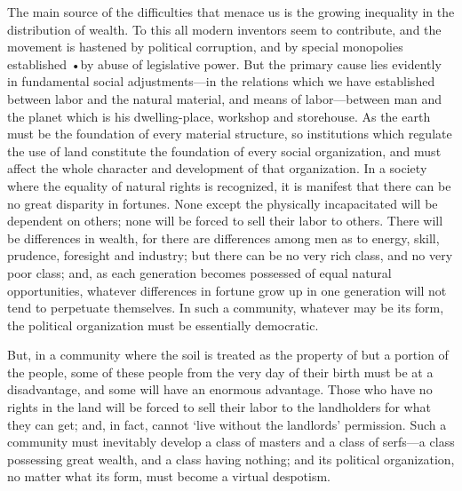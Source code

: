 \documentclass{book}
\begin{document}
The main source of the difficulties that menace us is the growing inequality in the distribution of wealth. To this all modern inventors seem to contribute, and the movement is hastened by political corruption, and by special monopolies established •by abuse of legislative power. But the primary cause lies evidently in fundamental social adjustments—in the relations which we have established between labor and the natural material, and means of labor—between man and the planet which is his dwelling-place, workshop and storehouse. As the earth must be the foundation of every material structure, so institutions which regulate the use of land constitute the foundation of every social organization, and must affect the whole character and development of that organization. In a society where the equality of natural rights is recognized, it is manifest that there can be no great disparity in fortunes. None except the physically incapacitated will be dependent on others; none will be forced to sell their labor to others. There will be differences in wealth, for there are differences among men as to energy, skill, prudence, foresight and industry; but there can be no very rich class, and no very poor class; and, as each generation becomes possessed of equal natural opportunities, whatever differences in fortune grow up in one generation will not tend to perpetuate themselves. In such a community, whatever may be its form, the political organization must be essentially democratic.

But, in a community where the soil is treated as the property of but a portion of the people, some of these people from the very day of their birth must be at a disadvantage, and some will have an enormous advantage. Those who have no rights in the land will be forced to sell their labor to the landholders for what they can get; and, in fact, cannot ‘live without the landlords’ permission. Such a community must inevitably develop a class of masters and a class of serfs—a class possessing great wealth, and a class having nothing; and its political organization, no matter what its form, must become a virtual despotism.
\end{document}
